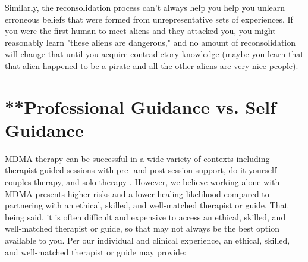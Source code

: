 \documentclass[12pt,letterpaper]{book}
\begin{document}
\begin{itemize}
        Similarly, the reconsolidation process can't always help you help you unlearn erroneous beliefs that were formed from unrepresentative sets of experiences. If you were the first human to meet aliens and they attacked you, you might reasonably learn "these aliens are dangerous," and no amount of reconsolidation will change that until you acquire contradictory knowledge (maybe you learn that that alien happened to be a pirate and all the other aliens are very nice people).
\end{itemize}

\section{**Professional Guidance vs. Self Guidance}
\label{professionalVSSelf}
MDMA-therapy can be successful in a wide variety of contexts including therapist-guided sessions with pre- and post-session support, do-it-yourself couples therapy, and solo therapy \cite{mitchellMDMAClinicalTrial2,colbertEvenings,hillsSolo}. However, we believe working alone with MDMA presents higher risks and a lower healing likelihood compared to partnering with an ethical, skilled, and well-matched therapist or guide. That being said, it is often difficult and expensive to access an ethical, skilled, and well-matched therapist or guide, so that may not always be the best option available to you. Per our individual and clinical experience, an ethical, skilled, and well-matched therapist or guide may provide:
\end{document}
